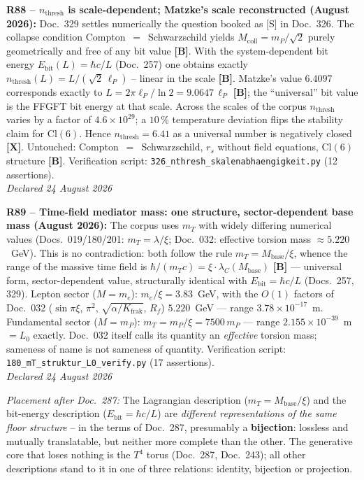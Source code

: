 \textbf{R88 -- $n_{\mathrm{thresh}}$ is scale-dependent; Matzke's scale reconstructed (August 2026):}
Doc.~329 settles numerically the question booked as [S] in Doc.~326.
The collapse condition Compton~$=$~Schwarzschild yields $M_{\mathrm{coll}} = m_P/\sqrt{2}$ purely geometrically and free of any bit value \textbf{[B]}.
With the system-dependent bit energy $E_{\mathrm{bit}}(L) = \hbar c/L$ (Doc.~257) one obtains exactly $n_{\mathrm{thresh}}(L) = L/(\sqrt{2}\,\ell_P)$ -- linear in the scale \textbf{[B]}.
Matzke's value $6.4097$ corresponds exactly to $L = 2\pi\ell_P/\ln 2 = 9.0647\,\ell_P$ \textbf{[B]}; the ``universal'' bit value is the FFGFT bit energy at that scale.
Across the scales of the corpus $n_{\mathrm{thresh}}$ varies by a factor of $4.6\times10^{29}$; a $10\,\%$ temperature deviation flips the stability claim for $\mathrm{Cl}(6)$.
Hence $n_{\mathrm{thresh}} = 6.41$ as a universal number is negatively closed \textbf{[X]}.
Untouched: Compton~$=$~Schwarzschild, $r_s$ without field equations, $\mathrm{Cl}(6)$ structure \textbf{[B]}.
Verification script: \texttt{326\_nthresh\_skalenabhaengigkeit.py} (12 assertions).\\
\emph{Declared 24 August 2026}

\medskip

\textbf{R89 -- Time-field mediator mass: one structure, sector-dependent base mass (August 2026):}
The corpus uses $m_T$ with widely differing numerical values (Docs.~019/180/201: $m_T = \lambda/\xi$; Doc.~032: effective torsion mass $\approx 5.220$~GeV). This is no contradiction: both follow the rule $m_T = M_\mathrm{base}/\xi$, whence the range of the massive time field is $\hbar/(m_T c) = \xi\cdot\lambda_C(M_\mathrm{base})$ \textbf{[B]} --- universal form, sector-dependent value, structurally identical with $E_\mathrm{bit} = \hbar c/L$ (Docs.~257, 329).
Lepton sector ($M = m_e$): $m_e/\xi = 3.83$~GeV, with the $O(1)$ factors of Doc.~032 ($\sin\pi\xi$, $\pi^2$, $\sqrt{\alpha/K_\mathrm{frak}}$, $R_f$) $5.220$~GeV --- range $3.78\times10^{-17}$~m.
Fundamental sector ($M = m_P$): $m_T = m_P/\xi = 7500\,m_P$ --- range $2.155\times10^{-39}$~m $= L_0$ exactly.
Doc.~032 itself calls its quantity an \emph{effective} torsion mass; sameness of name is not sameness of quantity.
Verification script: \texttt{180\_mT\_struktur\_L0\_verify.py} (17 assertions).\\
\emph{Declared 24 August 2026}

\medskip

\noindent\textit{Placement after Doc.~287:} The Lagrangian description
($m_T = M_\mathrm{base}/\xi$) and the bit-energy description
($E_\mathrm{bit} = \hbar c/L$) are \emph{different representations of the same
floor structure} -- in the terms of Doc.~287, presumably a \textbf{bijection}:
lossless and mutually translatable, but neither more complete than the other.
The generative core that loses nothing is the $T^4$ torus (Doc.~287, Doc.~243);
all other descriptions stand to it in one of three relations:
identity, bijection or projection.

